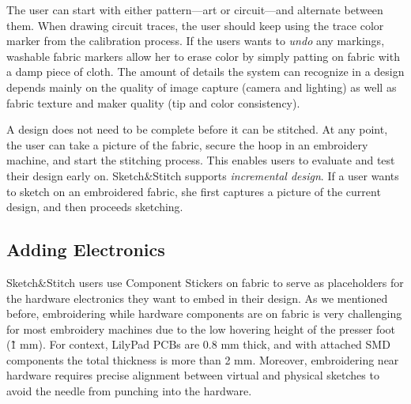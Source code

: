 \documentclass[header.tex]{subfiles}
\begin{document}
The user can start with either pattern---art or circuit---and alternate between them. When drawing circuit traces, the user should keep using the trace color marker from the calibration process. If the users wants to \textit{undo} any markings, washable fabric markers allow her to erase color by simply patting on fabric with a damp piece of cloth. The amount of details the system can recognize in a design depends mainly on the quality of image capture (camera and lighting) as well as fabric texture and maker quality (tip and color consistency). %

A design does not need to be complete before it can be stitched. At any point, the user can take a picture of the fabric, secure the hoop in an embroidery machine, and start the stitching process. This enables users to evaluate and test their design early on.  Sketch\&Stitch supports \textit{incremental design}. If a user wants to sketch on an embroidered fabric, she first captures a picture of the current design, and then proceeds sketching.


\subsection{Adding Electronics}
Sketch\&Stitch users use Component Stickers on fabric to serve as placeholders for the hardware electronics they want to embed in their design. As we mentioned before, embroidering while hardware components are on fabric is very challenging for most embroidery machines due to the low hovering height of the presser foot (\~ 1 mm). For context, LilyPad PCBs are 0.8 mm thick, and with attached SMD components the total thickness is more than 2 mm. Moreover, embroidering near hardware requires precise alignment between virtual and physical sketches to avoid the needle from punching into the hardware. 
\end{document}
